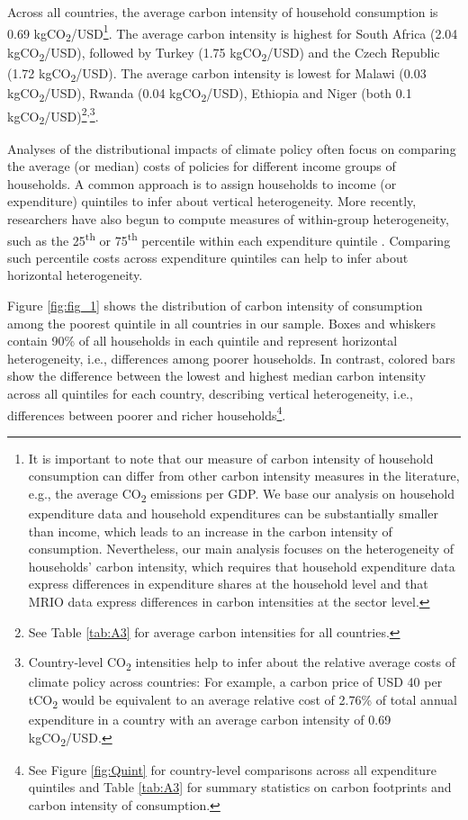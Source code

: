 \documentclass[12pt, a4paper]{article}
\begin{document}
Across all countries, the average carbon intensity of household consumption is 0.69 kgCO\textsubscript{2}/USD\footnote{It is important to note that our measure of carbon intensity of household consumption can differ from other carbon intensity measures in the literature, e.g., the average CO\textsubscript{2} emissions per GDP.  We base our analysis on household expenditure data and household expenditures can be substantially smaller than income, which leads to an increase in the carbon intensity of consumption. Nevertheless, our main analysis focuses on the heterogeneity of households' carbon intensity, which requires that household expenditure data express differences in expenditure shares at the household level and that MRIO data express differences in carbon intensities at the sector level.}. The average carbon intensity is highest for South Africa (2.04 kgCO\textsubscript{2}/USD), followed by Turkey (1.75 kgCO\textsubscript{2}/USD) and the Czech Republic (1.72 kgCO\textsubscript{2}/USD). The average carbon intensity is lowest for Malawi (0.03 kgCO\textsubscript{2}/USD), Rwanda (0.04 kgCO\textsubscript{2}/USD), Ethiopia and Niger (both 0.1 kgCO\textsubscript{2}/USD)\footnote{See Table \ref{tab:A3} for average carbon intensities for all countries.}\textsuperscript{,}\footnote{Country-level CO\textsubscript{2} intensities help to infer about the relative average costs of climate policy across countries: For example, a carbon price of USD 40 per tCO\textsubscript{2} \autocite{Stiglitz.2017} would be equivalent to an average relative cost of 2.76\% of total annual expenditure in a country with an average carbon intensity of 0.69 kgCO\textsubscript{2}/USD.}.

Analyses of the distributional impacts of climate policy often focus on comparing the average (or median) costs of policies for different income groups of households. A common approach is to assign households to income (or expenditure) quintiles to infer about vertical heterogeneity. More recently, researchers have also begun to compute measures of within-group heterogeneity, such as the 25\textsuperscript{th} or 75\textsuperscript{th} percentile within each expenditure quintile \autocite{Cronin.2019, Missbach.2024}. Comparing such percentile costs across expenditure quintiles can help to infer about horizontal heterogeneity.

Figure \ref{fig:fig_1} shows the distribution of carbon intensity of consumption among the poorest quintile in all countries in our sample. Boxes and whiskers contain 90\% of all households in each quintile and represent horizontal heterogeneity, i.e., differences among poorer households. In contrast, colored bars show the difference between the lowest and highest median carbon intensity across all quintiles for each country, describing vertical heterogeneity, i.e., differences between poorer and richer households\footnote{See Figure \ref{fig:Quint} for country-level comparisons across all expenditure quintiles and Table \ref{tab:A3} for summary statistics on carbon footprints and carbon intensity of consumption.}.
\end{document}
